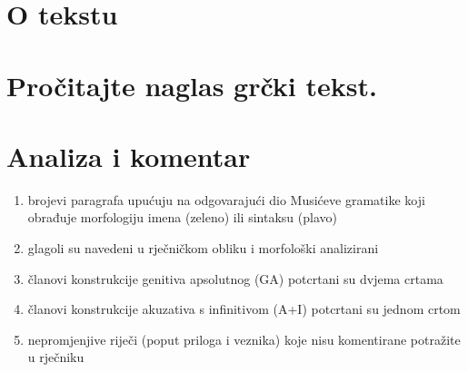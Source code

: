 


\section*{O tekstu}



\newpage

\section*{Pročitajte naglas grčki tekst.}


\medskip

{\large
\noindent 

}

\section*{Analiza i komentar}

\begin{enumerate}[label=\alph*)]
\item brojevi paragrafa upućuju na odgovarajući dio Musićeve gramatike koji obrađuje
morfologiju imena (zeleno) ili sintaksu (plavo)
\item glagoli su navedeni u rječničkom obliku i morfološki analizirani
\item članovi konstrukcije genitiva apsolutnog (GA) potcrtani su dvjema crtama
\item članovi konstrukcije akuzativa s infinitivom (A+I) potcrtani su jednom crtom
\item nepromjenjive riječi (poput priloga i veznika) koje nisu komentirane potražite u rječniku
\end{enumerate}


{\large
\noindent 

}

\begin{description}[noitemsep]


\end{description}

{\large
\noindent 

}

\begin{description}[noitemsep]


\end{description}



